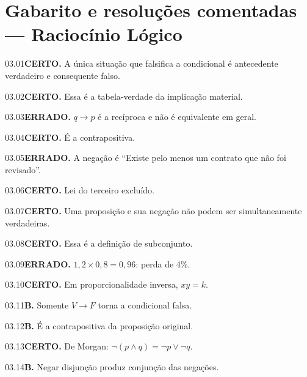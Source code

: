 \section{Gabarito e resoluções comentadas — Raciocínio Lógico}

\begin{solucao}{03.01}\textbf{CERTO.} A única situação que falsifica a condicional é antecedente verdadeiro e consequente falso.\end{solucao}
\begin{solucao}{03.02}\textbf{CERTO.} Essa é a tabela-verdade da implicação material.\end{solucao}
\begin{solucao}{03.03}\textbf{ERRADO.} $q\to p$ é a recíproca e não é equivalente em geral.\end{solucao}
\begin{solucao}{03.04}\textbf{CERTO.} É a contrapositiva.\end{solucao}
\begin{solucao}{03.05}\textbf{ERRADO.} A negação é ``Existe pelo menos um contrato que não foi revisado''.\end{solucao}
\begin{solucao}{03.06}\textbf{CERTO.} Lei do terceiro excluído.\end{solucao}
\begin{solucao}{03.07}\textbf{CERTO.} Uma proposição e sua negação não podem ser simultaneamente verdadeiras.\end{solucao}
\begin{solucao}{03.08}\textbf{CERTO.} Essa é a definição de subconjunto.\end{solucao}
\begin{solucao}{03.09}\textbf{ERRADO.} $1,2\times0,8=0,96$: perda de 4\%.\end{solucao}
\begin{solucao}{03.10}\textbf{CERTO.} Em proporcionalidade inversa, $xy=k$.\end{solucao}
\begin{solucao}{03.11}\textbf{B.} Somente $V\to F$ torna a condicional falsa.\end{solucao}
\begin{solucao}{03.12}\textbf{B.} É a contrapositiva da proposição original.\end{solucao}
\begin{solucao}{03.13}\textbf{CERTO.} De Morgan: $\neg(p\land q)=\neg p\lor\neg q$.\end{solucao}
\begin{solucao}{03.14}\textbf{B.} Negar disjunção produz conjunção das negações.\end{solucao}
